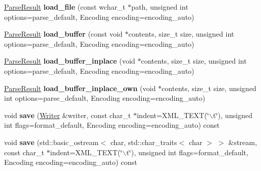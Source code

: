 \begin{DoxyCompactItemize}
\item 
\hypertarget{classphys_1_1xml_1_1Document_af39ca4d134cfba6ebdb003a3743586e4}{
\hyperlink{structphys_1_1xml_1_1ParseResult}{ParseResult} {\bfseries load\_\-file} (const wchar\_\-t $\ast$path, unsigned int options=parse\_\-default, Encoding encoding=encoding\_\-auto)}
\label{dd/d44/classphys_1_1xml_1_1Document_af39ca4d134cfba6ebdb003a3743586e4}

\item 
\hypertarget{classphys_1_1xml_1_1Document_a4506ef6f6c98bf43f7e146ab0015a188}{
\hyperlink{structphys_1_1xml_1_1ParseResult}{ParseResult} {\bfseries load\_\-buffer} (const void $\ast$contents, size\_\-t size, unsigned int options=parse\_\-default, Encoding encoding=encoding\_\-auto)}
\label{dd/d44/classphys_1_1xml_1_1Document_a4506ef6f6c98bf43f7e146ab0015a188}

\item 
\hypertarget{classphys_1_1xml_1_1Document_a38beaa65d14eca13dcf6d684be0e6d73}{
\hyperlink{structphys_1_1xml_1_1ParseResult}{ParseResult} {\bfseries load\_\-buffer\_\-inplace} (void $\ast$contents, size\_\-t size, unsigned int options=parse\_\-default, Encoding encoding=encoding\_\-auto)}
\label{dd/d44/classphys_1_1xml_1_1Document_a38beaa65d14eca13dcf6d684be0e6d73}

\item 
\hypertarget{classphys_1_1xml_1_1Document_af29061d7fe8efaa6618b678fd59d0cc6}{
\hyperlink{structphys_1_1xml_1_1ParseResult}{ParseResult} {\bfseries load\_\-buffer\_\-inplace\_\-own} (void $\ast$contents, size\_\-t size, unsigned int options=parse\_\-default, Encoding encoding=encoding\_\-auto)}
\label{dd/d44/classphys_1_1xml_1_1Document_af29061d7fe8efaa6618b678fd59d0cc6}

\item 
\hypertarget{classphys_1_1xml_1_1Document_a8c27a11a0f2f632265f85e292247d2e2}{
void {\bfseries save} (\hyperlink{classphys_1_1xml_1_1Writer}{Writer} \&writer, const char\_\-t $\ast$indent=XML\_\-TEXT(\char`\"{}$\backslash$t\char`\"{}), unsigned int flags=format\_\-default, Encoding encoding=encoding\_\-auto) const }
\label{dd/d44/classphys_1_1xml_1_1Document_a8c27a11a0f2f632265f85e292247d2e2}

\item 
\hypertarget{classphys_1_1xml_1_1Document_addda0a55772282c6887637a7531fc139}{
void {\bfseries save} (std::basic\_\-ostream$<$ char, std::char\_\-traits$<$ char $>$ $>$ \&stream, const char\_\-t $\ast$indent=XML\_\-TEXT(\char`\"{}$\backslash$t\char`\"{}), unsigned int flags=format\_\-default, Encoding encoding=encoding\_\-auto) const }
\label{dd/d44/classphys_1_1xml_1_1Document_addda0a55772282c6887637a7531fc139}


\end{DoxyCompactItemize}
